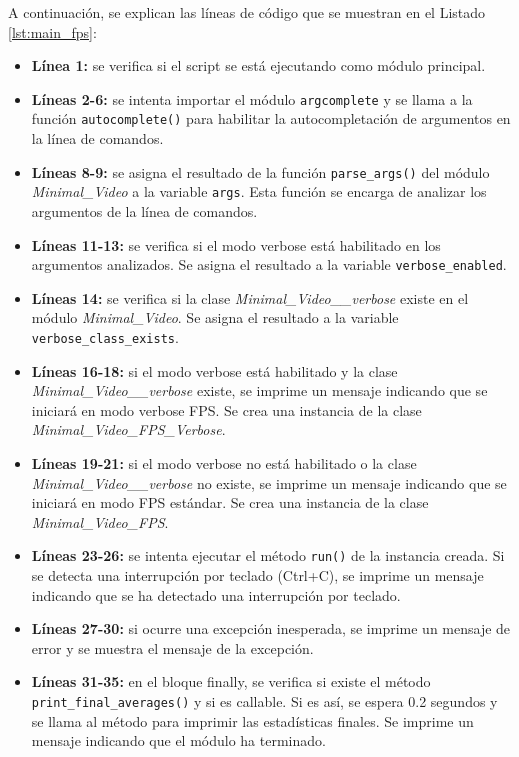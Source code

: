 A continuación, se explican las líneas de código que se muestran en el Listado \ref{lst:main_fps}:
\begin{itemize}
    \item \textbf{Línea 1:} se verifica si el script se está ejecutando como módulo principal.
    \item \textbf{Líneas 2-6:} se intenta importar el módulo \texttt{argcomplete} y se llama a la función \texttt{autocomplete()} para habilitar la autocompletación de argumentos en la línea de comandos.
    \item \textbf{Líneas 8-9:} se asigna el resultado de la función \texttt{parse\_args()} del módulo \textit{Minimal\_Video} a la variable \texttt{args}. Esta función se encarga de analizar los argumentos de la línea de comandos.
    \item \textbf{Líneas 11-13:} se verifica si el modo verbose está habilitado en los argumentos analizados. Se asigna el resultado a la variable \texttt{verbose\_enabled}.
    \item \textbf{Líneas 14:} se verifica si la clase \textit{Minimal\_Video\_\_verbose} existe en el módulo \textit{Minimal\_Video}. Se asigna el resultado a la variable \texttt{verbose\_class\_exists}.
    \item \textbf{Líneas 16-18:} si el modo verbose está habilitado y la clase \textit{Minimal\_Video\_\_verbose} existe, se imprime un mensaje indicando que se iniciará en modo verbose FPS. Se crea una instancia de la clase \textit{Minimal\_Video\_FPS\_Verbose}.
    \item \textbf{Líneas 19-21:} si el modo verbose no está habilitado o la clase \textit{Minimal\_Video\_\_verbose} no existe, se imprime un mensaje indicando que se iniciará en modo FPS estándar. Se crea una instancia de la clase \textit{Minimal\_Video\_FPS}.
    \item \textbf{Líneas 23-26:} se intenta ejecutar el método \texttt{run()} de la instancia creada. Si se detecta una interrupción por teclado (Ctrl+C), se imprime un mensaje indicando que se ha detectado una interrupción por teclado.
    \item \textbf{Líneas 27-30:} si ocurre una excepción inesperada, se imprime un mensaje de error y se muestra el mensaje de la excepción.
    \item \textbf{Líneas 31-35:} en el bloque finally, se verifica si existe el método \texttt{print\_final\_averages()} y si es callable. Si es así, se espera 0.2 segundos y se llama al método para imprimir las estadísticas finales. Se imprime un mensaje indicando que el módulo ha terminado.
\end{itemize}
\vspace{\baselineskip}

